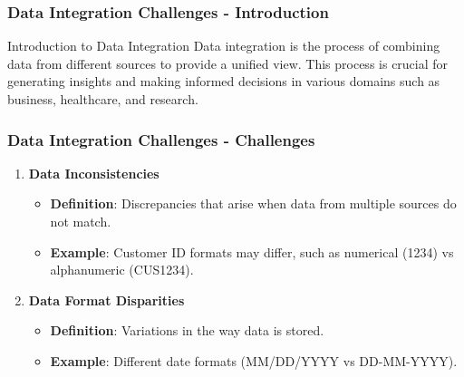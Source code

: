 \documentclass{beamer}
\begin{document}
\begin{frame}[fragile]
    \frametitle{Data Integration Challenges - Introduction}
    \begin{block}{Introduction to Data Integration}
        Data integration is the process of combining data from different sources to provide a unified view. This process is crucial for generating insights and making informed decisions in various domains such as business, healthcare, and research.
    \end{block}
\end{frame}

\begin{frame}[fragile]
    \frametitle{Data Integration Challenges - Challenges}
    \begin{enumerate}
        \item \textbf{Data Inconsistencies}
            \begin{itemize}
                \item \textbf{Definition}: Discrepancies that arise when data from multiple sources do not match.
                \item \textbf{Example}: Customer ID formats may differ, such as numerical (1234) vs alphanumeric (CUS1234).
            \end{itemize}
        \item \textbf{Data Format Disparities}
            \begin{itemize}
                \item \textbf{Definition}: Variations in the way data is stored.
                \item \textbf{Example}: Different date formats (MM/DD/YYYY vs DD-MM-YYYY).
            \end{itemize}
    \end{enumerate}
\end{frame}
\end{document}
